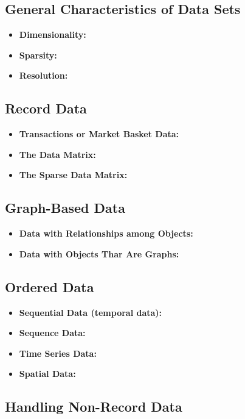 		\subsection*{General Characteristics of Data Sets}
			\begin{itemize}
				\item {\bf Dimensionality:}
				\item {\bf Sparsity:}
				\item {\bf Resolution:}
			\end{itemize}

		\subsection*{Record Data}
			\begin{itemize}
				\item {\bf Transactions or Market Basket Data:}
				\item {\bf The Data Matrix:}
				\item {\bf The Sparse Data Matrix:}
			\end{itemize}

		\subsection*{Graph-Based Data}
			\begin{itemize}
				\item {\bf Data with Relationships among Objects:}
				\item {\bf Data with Objects Thar Are Graphs:}
			\end{itemize}

		\subsection*{Ordered Data}
			\begin{itemize}
				\item {\bf Sequential Data (temporal data):}
				\item {\bf Sequence Data:}
				\item {\bf Time Series Data:}
				\item {\bf Spatial Data:}
			\end{itemize}

		\subsection*{Handling Non-Record Data}
